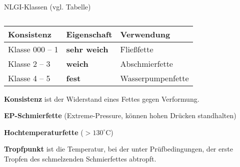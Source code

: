 NLGI-Klassen (vgl. Tabelle)

\begin{table}[!ht]%
\centering 
	\caption{}%
\begin{tabular}{@{}lll@{}}
\hline
\textbf{Konsistenz} & \textbf{Eigenschaft} & \textbf{Verwendung} \\
\hline
Klasse 000 -- 1 & \textbf{sehr weich} & Fließfette \\
Klasse 2 -- 3 & \textbf{weich} & Abschmierfette \\
Klasse 4 -- 5 & \textbf{fest} & Wasserpumpenfette \\
\hline
\end{tabular} 
\end{table}

\textbf{Konsistenz} ist der Widerstand eines Fettes gegen Verformung.

\textbf{EP-Schmierfette} (Extreme-Pressure, können hohen Drücken
standhalten)

\textbf{Hochtemperaturfette} ($> 130^\circ\text{C}$)

\textbf{Tropfpunkt} ist die Temperatur, bei der unter Prüfbedingungen,
der erste Tropfen des schmelzenden Schmierfettes abtropft.

